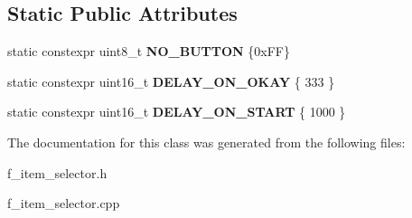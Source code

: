 \subsection*{Static Public Attributes}
\begin{DoxyCompactItemize}
\item 
\mbox{\label{classui_1_1_item_selector_a89ef1f7dd9407dacacb1b848942385c7}} 
static constexpr uint8\+\_\+t {\bfseries N\+O\+\_\+\+B\+U\+T\+T\+ON} \{0x\+F\+F\}
\item 
\mbox{\label{classui_1_1_item_selector_a1233c16932511eda9209344bd02c1d91}} 
static constexpr uint16\+\_\+t {\bfseries D\+E\+L\+A\+Y\+\_\+\+O\+N\+\_\+\+O\+K\+AY} \{ 333 \}
\item 
\mbox{\label{classui_1_1_item_selector_a8090e51699b41267c9f919b379094348}} 
static constexpr uint16\+\_\+t {\bfseries D\+E\+L\+A\+Y\+\_\+\+O\+N\+\_\+\+S\+T\+A\+RT} \{ 1000 \}
\end{DoxyCompactItemize}


The documentation for this class was generated from the following files\+:\begin{DoxyCompactItemize}
\item 
f\+\_\+item\+\_\+selector.\+h\item 
f\+\_\+item\+\_\+selector.\+cpp\end{DoxyCompactItemize}
